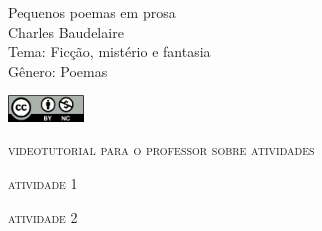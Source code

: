 \documentclass[smaller,professionalfonts,15pt]{beamer}
\begin{document}
										\begin{frame}\begin{raggedleft}
										\Huge 
Pequenos poemas em prosa						\\
										\huge 
Charles Baudelaire							\\
										\bigskip
										\normalsize
Tema: Ficção, mistério e fantasia		\\	
Gênero: Poemas		\\\vfill\hfill
\publishername

										\end{raggedleft}

\smallskip\includegraphics[width=2cm]{ccbync.png}\hfill
\end{frame}


\begin{frame}{\textsc{videotutorial para o professor sobre atividades}}
\vspace{-2cm}\begin{figure}
\end{figure}
\end{frame}


\begin{frame}
\hfill\Huge
\textsc{atividade 1}
\end{frame}


\begin{frame}
\hfill\Huge
\textsc{atividade 2}
\end{frame}
\end{document}
